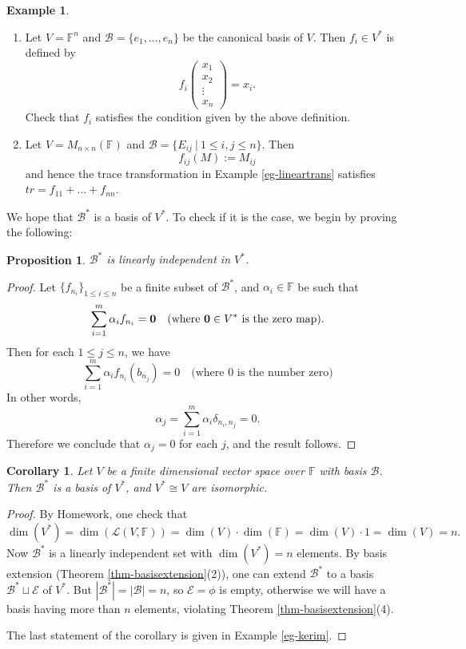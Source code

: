\documentclass[11pt,openany]{book}
\theoremstyle{plain}
\newtheorem{proposition}[proposition]{Proposition}
\newtheorem{corollary}[corollary]{Corollary}
\theoremstyle{definition}
\newtheorem{example}[example]{Example}
\theoremstyle{remark}
\begin{document}
\begin{example} \
    \begin{enumerate}
        \item Let $V = \mathbb{F}^n$ and $\mathcal{B} = \{e_1, \dots, e_n\}$ be the canonical basis of $V$. Then $f_i \in V^*$ is defined by
        $$f_i\begin{pmatrix} x_1 \\ x_2 \\ \vdots \\ x_n \end{pmatrix} = x_i.$$
        Check that $f_i$ satisfies the condition given by the above definition.

        \item Let $V = M_{n \times n}(\mathbb{F})$ and $\mathcal{B} = \{E_{ij}\ |\ 1 \leq i, j \leq n\}$. Then
        $$f_{ij}(M) := M_{ij}$$
        and hence the trace transformation in Example \ref{eg-lineartrans} satisfies $tr = f_{11} + \dots + f_{nn}$.
    \end{enumerate}
\end{example}

We hope that $\mathcal{B}^*$ is a basis of $V^*$. To check if it is the case, we begin by proving the following:
\begin{proposition}
    $\mathcal{B}^*$ is linearly independent in $V^*$.
\end{proposition}
\begin{proof}
    Let $\{f_{n_i}\}_{1 \leq i \leq n}$ be a finite subset of $\mathcal{B}^*$, and $\alpha_i \in \mathbb{F}$ be such that 
    $$ \sum_{i=1}^{m} \alpha_if_{n_i} = {\bf 0} \quad \text{(where}\ {\bf 0} \in V^*\ \text{is the zero map)}.$$
    Then for each $1 \leq j \leq n$, we have 
    $$\sum_{i=1}^{m} \alpha_i f_{n_i} (b_{n_j}) = 0 \quad \text{(where 0 is the number zero)} $$
    In other words,
    $$\alpha_j = \sum_{i=1}^{m} \alpha_i \delta_{n_i, n_j} = 0.$$
    Therefore we conclude that $\alpha_j=0$ for each $j$, and the result follows.
    \end{proof}

\begin{corollary}
    Let $V$ be a finite dimensional vector space over $\mathbb{F}$ with basis $\mathcal{B}$. Then $\mathcal{B}^*$ is a basis of $V^*$, and $V^* \cong V$ are isomorphic.
\end{corollary}
\begin{proof}
    By Homework, one check that 
    $$\dim(V^*) = \dim(\mathcal{L}(V,\mathbb{F})) = \dim(V) \cdot \dim(\mathbb{F}) = \dim(V) \cdot 1 = \dim(V) = n.$$ 
    Now $\mathcal{B}^*$ is a linearly independent set with $\dim(V^*) = n$ elements. By basis extension (Theorem \ref{thm-basisextension}(2)), one can extend $\mathcal{B}^*$ to a basis $\mathcal{B}^* \sqcup \mathcal{E}$ of $V^*$. But $|\mathcal{B}^*| = |\mathcal{B}|=n$, so $\mathcal{E} = \phi$ is empty, otherwise we will have a basis having more than $n$ elements, violating Theorem \ref{thm-basisextension}(4).

    The last statement of the corollary is given in Example \ref{eg-kerim}.
\end{proof}
\end{document}

